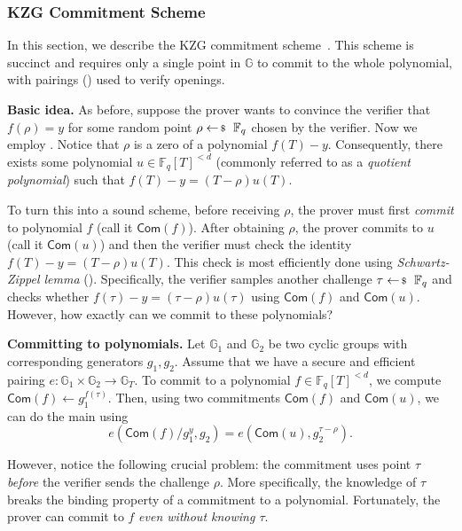 \documentclass[../../book]{subfiles}
\begin{document}
\subsubsection{KZG Commitment Scheme}

In this section, we describe the KZG commitment scheme~\cite{AC:KatZavGol10}. This scheme is succinct and requires only a single point in $\mathbb{G}$ to commit to the whole polynomial, with pairings () used to verify openings.

\textbf{Basic idea.} As before, suppose the prover wants to convince the verifier that $f(\rho)=y$ for some random point $\rho \leftarrowS \mathbb{F}_q$ chosen by the verifier.
Now we employ . Notice that $\rho$ is a zero of a polynomial $f(T)-y$. 
Consequently, there exists some polynomial $u \in \mathbb{F}_q[T]^{<d}$ (commonly referred to as a \emph{quotient polynomial}) such that $f(T)-y = (T-\rho)u(T)$.

To turn this into a sound scheme, before receiving $\rho$, the prover must first \emph{commit} to polynomial $f$ (call it $\mathsf{Com}(f)$).
After obtaining $\rho$, the prover commits to $u$ (call it $\mathsf{Com}(u)$) and then the verifier must check the identity $f(T)-y = (T-\rho)u(T)$.
This check is most efficiently done using \textit{Schwartz-Zippel lemma} ().
Specifically, the verifier samples another challenge $\tau \leftarrowS \mathbb{F}_q$ and checks whether $f(\tau)-y=(\tau-\rho)u(\tau)$ using $\mathsf{Com}(f)$ and $\mathsf{Com}(u)$.
However, how exactly can we commit to these polynomials?

\textbf{Committing to polynomials.} Let $\mathbb{G}_1$ and $\mathbb{G}_2$ be two cyclic groups with corresponding generators $g_1,g_2$.
Assume that we have a secure and efficient pairing $e: \mathbb{G}_1 \times \mathbb{G}_2 \to \mathbb{G}_T$.
To commit to a polynomial $f \in \mathbb{F}_q[T]^{<d}$, we compute $\mathsf{Com}(f) \gets g_1^{f(\tau)}$.
Then, using two commitments $\mathsf{Com}(f)$ and $\mathsf{Com}(u)$, we can do the main using
\begin{equation*}
    e(\mathsf{Com}(f)/g_1^y, g_2) = e(\mathsf{Com}(u), g_2^{\tau-\rho}).
\end{equation*}

However, notice the following crucial problem: the commitment uses point $\tau$ \emph{before} the verifier sends the challenge $\rho$.
More specifically, the knowledge of $\tau$ breaks the binding property of a commitment to a polynomial.
Fortunately, the prover can commit to $f$ \emph{even without knowing $\tau$}.
\end{document}

